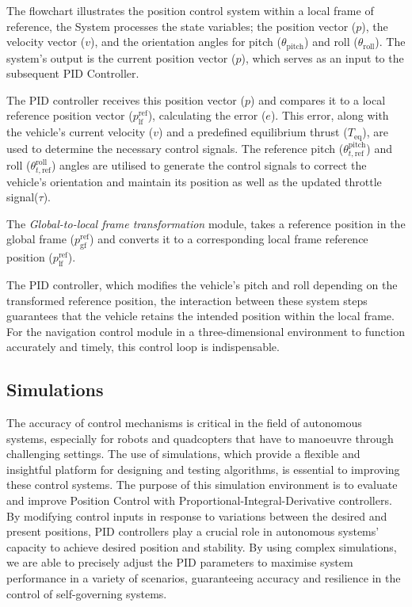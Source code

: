 \documentclass{report}
\begin{document}
The flowchart illustrates the position control system within a local frame of reference, the System processes the state variables; the position vector (\(p\)), the velocity vector (\(v\)), and the orientation angles for pitch (\( \theta_{\text{pitch}} \)) and roll (\( \theta_{\text{roll}} \)). The system's output is the current position vector (\(p\)), which serves as an input to the subsequent PID Controller.

The PID controller receives this position vector (\(p\)) and compares it to a local reference position vector (\(p_{\text{lf}}^{\text{ref}} \)), calculating the error (\( e \)). This error, along with the vehicle's current velocity (\(v\)) and a predefined equilibrium thrust (\( T_{\text{eq}} \)), are used to determine the necessary control signals. The reference pitch (\( \theta_{t,\text{ref}}^{\text{pitch}} \)) and roll (\( \theta_{t,\text{ref}}^{\text{roll}} \)) angles are utilised to generate the control signals to correct the vehicle's orientation and maintain its position as well as the updated throttle signal(\(\tau\)).


The \textit{Global-to-local frame transformation} module, takes a reference position in the global frame (\(p_{\text{gf}}^{\text{ref}} \)) and converts it to a corresponding local frame reference position (\(p_{\text{lf}}^{\text{ref}} \)).

The PID controller, which modifies the vehicle’s pitch and roll depending on the transformed reference position, the interaction between these system steps guarantees that the vehicle retains the intended position within the local frame. For the navigation control module in a three-dimensional environment to function accurately and timely, this control loop is indispensable.


\subsection{Simulations}\label{PID_simulations} The accuracy of control
mechanisms is critical in the field of autonomous systems, especially for robots
and quadcopters that have to manoeuvre through challenging settings. The use of
simulations, which provide a flexible and insightful platform for designing and
testing algorithms, is essential to improving these control systems. The purpose
of this simulation environment is to evaluate and improve Position Control with
Proportional-Integral-Derivative controllers. By modifying control inputs in
response to variations between the desired and present positions, PID
controllers play a crucial role in autonomous systems' capacity to achieve
desired position and stability. By using complex simulations, we are able to
precisely adjust the PID parameters to maximise system performance in a variety
of scenarios, guaranteeing accuracy and resilience in the control of
self-governing systems.
\end{document}
